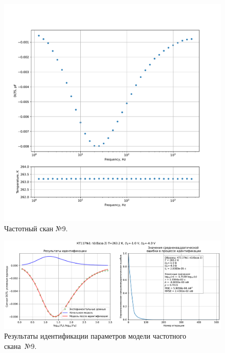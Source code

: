 \begin{figure}[!ht]
    \centering
    \includegraphics[width=1\textwidth]{../plots/КТ117№1_п1(база 2)_2500Гц-1Гц_1пФ_-10С_-1В-4В_100мВ_20мкс_шаг_0,1.pdf}
    \caption{Частотный скан №9.}
    \label{pic:frequency_scan_9}
\end{figure}

\begin{figure}[!ht]
    \centering
    \includegraphics[width=1\textwidth]{../plots/КТ117№1_п1(база 2)_2500Гц-1Гц_1пФ_-10С_-1В-4В_100мВ_20мкс_шаг_0,1_model.pdf}
    \caption{Результаты идентификации параметров модели частотного скана~№9.}
    \label{pic:frequency_scan_model9}
\end{figure}

\pagebreak


